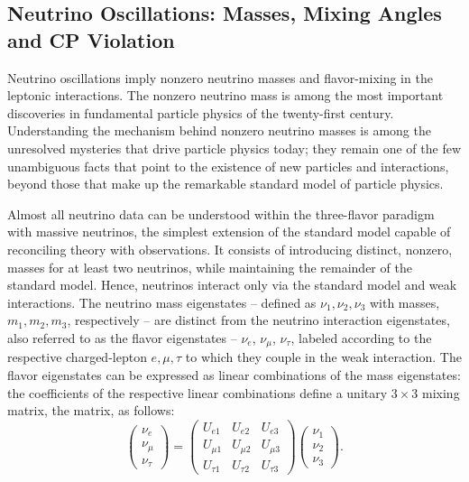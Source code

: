 \subsection{Neutrino Oscillations: Masses, Mixing Angles and CP Violation}

Neutrino oscillations imply nonzero neutrino masses and flavor-mixing 
in the leptonic  interactions.  The nonzero neutrino mass is among the most important discoveries in fundamental 
particle physics of the twenty-first century. Understanding the mechanism 
behind nonzero neutrino masses is among the unresolved mysteries that 
drive particle physics today; they remain one of the few unambiguous 
facts that point to the existence of new particles and interactions, 
beyond those that make up the remarkable standard model of 
particle physics.

Almost all neutrino data can be understood within the three-flavor paradigm 
with massive neutrinos,
the simplest extension of the standard model capable of reconciling 
theory with observations.  
It consists of introducing distinct, nonzero, masses for at least two 
neutrinos, while maintaining the remainder of the standard model. Hence, neutrinos 
interact only via the standard model  and   weak 
interactions. The neutrino mass eigenstates -- defined as $\nu_1,\nu_2, \nu_3$ 
with masses, $m_1, m_2, m_3$, respectively -- are distinct from the neutrino 
 interaction eigenstates, also referred to as the flavor 
eigenstates -- $\nu_e$, $\nu_{\mu}$, $\nu_{\tau}$, labeled according 
to the respective charged-lepton $e,\mu,\tau$ to which they couple in 
the  weak interaction. The flavor eigenstates can be expressed 
as linear combinations of the mass eigenstates: 
the coefficients of the respective linear combinations define a 
unitary $3\times 3$ mixing matrix, the 
 matrix, as follows:
\begin{equation}
\left(\begin{array}{c} \nu_e \\ \nu_{\mu} \\ \nu_{\tau} \end{array}\right) = \left(\begin{array}{ccc} U_{e1} & U_{e2} & U_{e3} \\  U_{\mu1} & U_{\mu2} & U_{\mu3}  \\  U_{\tau1} & U_{\tau2} &  U_{\tau3}  \end{array}\right) \left(\begin{array}{c} \nu_1 \\ \nu_2 \\ \nu_3 \end{array}\right).
\end{equation}

